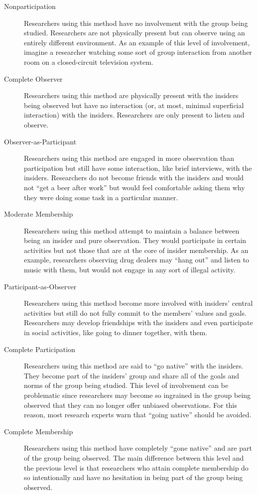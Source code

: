 \begin{description}

	\item[Nonparticipation] Researchers using this method have no involvement with the group being studied. Researchers are not physically present but can observe using an entirely different environment. As an example of this level of involvement, imagine a researcher watching some sort of group interaction from another room on a closed-circuit television system.

	\item[Complete Observer] Researchers using this method are physically present with the insiders being observed but have no interaction (or, at most, minimal superficial interaction) with the insiders. Researchers are only present to listen and observe.

	\item[Observer-as-Participant] Researchers using this method are engaged in more observation than participation but still have some interaction, like brief interviews, with the insiders. Researchers do not become friends with the insiders and would not ``get a beer after work'' but would feel comfortable asking them why they were doing some task in a particular manner. 

	\item[Moderate Membership] Researchers using this method attempt to maintain a balance between being an insider and pure observation. They would participate in certain activities but not those that are at the core of insider membership. As an example, researchers observing drug dealers may ``hang out'' and listen to music with them, but would not engage in any sort of illegal activity.

	\item[Participant-as-Observer] Researchers using this method become more involved with insiders' central activities but still do not fully commit to the members' values and goals. Researchers may develop friendships with the insiders and even participate in social activities, like going to dinner together, with them.

	\item[Complete Participation] Researchers using this method are said to ``go native'' with the insiders. They become part of the insiders' group and share all of the goals and norms of the group being studied. This level of involvement can be problematic since researchers may become so ingrained in the group being observed that they can no longer offer unbiased observations. For this reason, most research experts warn that ``going native'' should be avoided.

	\item[Complete Membership] Researchers using this method have completely ``gone native'' and are part of the group being observed. The main difference between this level and the previous level is that researchers who attain complete membership do so intentionally and have no hesitation in being part of the group being observed.

\end{description}


